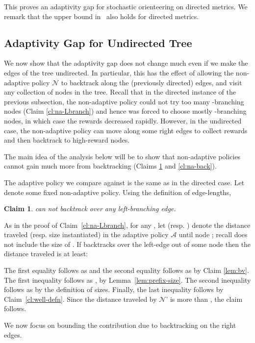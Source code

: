 \documentclass[11pt,letterpaper]{article}
\newtheorem{claim}[theorem]{Claim}
\numberwithin{algorithm}{section}
\newenvironment{proof}{

\noindent{\bf Proof:}}
{\hfill


}
\newcommand{\A}[0]{{\ensuremath{\mathcal{A}}}\xspace}
\newcommand{\N}[0]{{\ensuremath{\mathcal{N}}}\xspace}
\begin{document}
This proves an  adaptivity gap for stochastic orienteering on directed metrics. We remark that the  upper bound in~\cite{GKNR12} also holds for directed metrics.

\subsection{Adaptivity Gap for Undirected Tree}

We now show that the adaptivity gap does not change much even if we make the edges of the tree undirected.
In particular, this has the effect of allowing the non-adaptive policy \N to backtrack along the (previously directed) edges, and visit any collection of nodes in the tree.
Recall that in the directed instance of the previous subsection, the non-adaptive policy could not try too many -branching nodes (Claim \ref{cl:na-Lbranch}) and hence was forced to choose mostly -branching nodes, in which case the rewards decreased rapidly.
However, in the undirected case, the non-adaptive policy can move along some right edges to collect rewards and then backtrack to high-reward nodes.

The main idea of the analysis below will be to show that  non-adaptive policies cannot gain much more from backtracking (Claims \ref{cl:na-noLback} and \ref{cl:na-back}).

The adaptive policy we compare against is the same as in the directed case. Let  denote some fixed non-adaptive policy.
Using the definition of edge-lengths,
\begin{claim} \label{cl:na-noLback}
 can not backtrack over any left-branching edge.
\end{claim}
\begin{proof}
As in the proof of Claim~\ref{cl:na-Lbranch}, for any , let  (resp. ) denote the distance traveled (resp. size instantiated) in the adaptive policy \A until node ; recall  does not include the size of . If  backtracks over the left-edge  out of some node  then the distance traveled is at least:

The first equality follows as  and the second equality follows as  by Claim 
\ref{lem:bv}.
The first inequality follows as ,  by Lemma~\ref{lem:prefix-size}. The second inequality follows as  by the definition of sizes. Finally, the last inequality follows by Claim~\ref{cl:well-defn}.
Since the distance traveled by \N' is more than , the claim follows.
\end{proof}

We now focus on bounding the contribution due to backtracking on the right edges.
\end{document}
